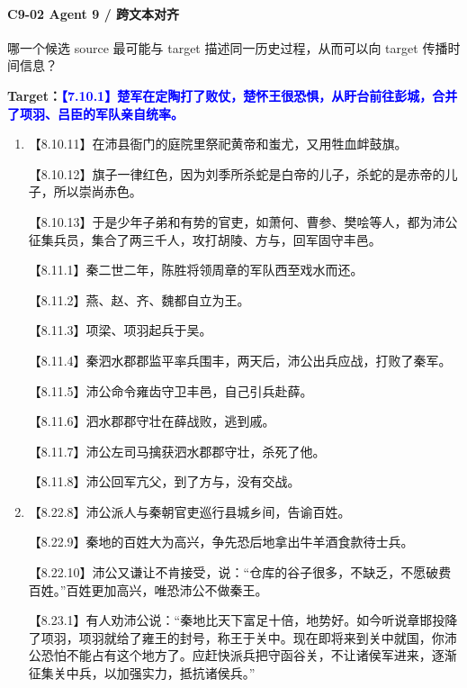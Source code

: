 \documentclass[fontset=none,11pt,a4paper]{ctexart}
\begin{document}
\paragraph{C9-02 \quad Agent 9 / 跨文本对齐}
哪一个候选 source 最可能与 target 描述同一历史过程，从而可以向 target 传播时间信息？

\textbf{Target：}\textcolor{blue}{\textbf{【7.10.1】楚军在定陶打了败仗，楚怀王很恐惧，从盱台前往彭城，合并了项羽、吕臣的军队亲自统率。}}

\begin{enumerate}[label=\Alph*.]
  \item
\noindent 【8.10.11】在沛县衙门的庭院里祭祀黄帝和蚩尤，又用牲血衅鼓旗。\par
\noindent 【8.10.12】旗子一律红色，因为刘季所杀蛇是白帝的儿子，杀蛇的是赤帝的儿子，所以崇尚赤色。\par
\noindent 【8.10.13】于是少年子弟和有势的官吏，如萧何、曹参、樊哙等人，都为沛公征集兵员，集合了两三千人，攻打胡陵、方与，回军固守丰邑。\par
\noindent 【8.11.1】秦二世二年，陈胜将领周章的军队西至戏水而还。\par
\noindent 【8.11.2】燕、赵、齐、魏都自立为王。\par
\noindent 【8.11.3】项梁、项羽起兵于吴。\par
\noindent 【8.11.4】秦泗水郡郡监平率兵围丰，两天后，沛公出兵应战，打败了秦军。\par
\noindent 【8.11.5】沛公命令雍齿守卫丰邑，自己引兵赴薛。\par
\noindent 【8.11.6】泗水郡郡守壮在薛战败，逃到戚。\par
\noindent 【8.11.7】沛公左司马擒获泗水郡郡守壮，杀死了他。\par
\noindent 【8.11.8】沛公回军亢父，到了方与，没有交战。\par
  \item
\noindent 【8.22.8】沛公派人与秦朝官吏巡行县城乡间，告谕百姓。\par
\noindent 【8.22.9】秦地的百姓大为高兴，争先恐后地拿出牛羊酒食款待士兵。\par
\noindent 【8.22.10】沛公又谦让不肯接受，说：“仓库的谷子很多，不缺乏，不愿破费百姓。”百姓更加高兴，唯恐沛公不做秦王。\par
\noindent 【8.23.1】有人劝沛公说：“秦地比天下富足十倍，地势好。如今听说章邯投降了项羽，项羽就给了雍王的封号，称王于关中。现在即将来到关中就国，你沛公恐怕不能占有这个地方了。应赶快派兵把守函谷关，不让诸侯军进来，逐渐征集关中兵，以加强实力，抵抗诸侯兵。”\par

\end{enumerate}
\end{document}
